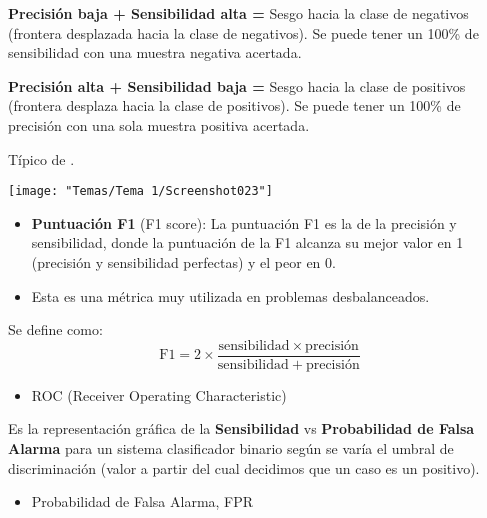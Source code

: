 \begin{minipage}{0.5\textwidth}
	\textbf{Precisión baja + Sensibilidad alta =} Sesgo hacia la clase de negativos (frontera desplazada hacia la clase de negativos). Se puede tener un 100\% de sensibilidad con una muestra negativa acertada.
	
	\textbf{Precisión alta + Sensibilidad baja =} Sesgo hacia la clase de positivos (frontera desplaza hacia la clase de positivos). Se puede tener un 100\% de precisión con una sola muestra positiva acertada.
	
	Típico de .
\end{minipage}\qquad\begin{minipage}{0.4\textwidth}
\begin{center}
	\texttt{[image: "Temas/Tema 1/Screenshot023"]}
\end{center}
\end{minipage}
\begin{itemize}
	\item \textbf{Puntuación F1} (F1 score): La puntuación F1 es la  de la precisión y sensibilidad, donde la puntuación de la F1 alcanza su mejor valor en 1 (precisión y sensibilidad perfectas) y el peor en 0.
	\item Esta es una métrica muy utilizada en problemas desbalanceados.
\end{itemize}
Se define como: \[ \mathrm{F1}=2\times\dfrac{\mathrm{sensibilidad}\times\text{precisión}}{\mathrm{sensibilidad}+\text{precisión}} \]
\begin{itemize}[label=\color{red}\textbullet, leftmargin=*]
	\item \color{lightblue}ROC (Receiver Operating Characteristic)
\end{itemize}
Es la representación gráfica de la \textbf{Sensibilidad} vs \textbf{Probabilidad de Falsa Alarma} para un sistema clasificador binario según se varía el umbral de discriminación (valor a partir del cual decidimos que un caso es un positivo).
\begin{itemize}[label=\color{red}\textbullet, leftmargin=*]
	\item \color{lightblue}Probabilidad de Falsa Alarma, FPR
\end{itemize}

